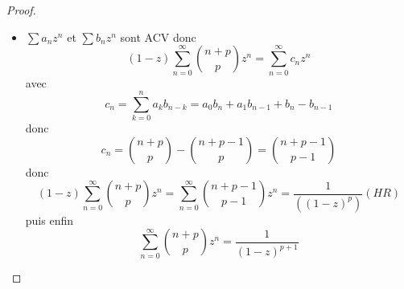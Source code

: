 \documentclass[11pt,hidelinks]{book}
\theoremstyle{mytheoremstyle}
\theoremstyle{mytheoremstyle}
\theoremstyle{mytheoremstyle}
\theoremstyle{mytheoremstyle}
\theoremstyle{mytheoremstyle}
\theoremstyle{mytheoremstyle}
\theoremstyle{mytheoremstyle}
\theoremstyle{mytheoremstyle}
\theoremstyle{myproblemstyle}
\def\is#1{\sum_{n=0}^\infty #1}
\def\se{\sum a_n z^n}
\def\seb#1{\sum #1_n z^n}
\begin{document}
\begin{adjustwidth}{-2em}{-1em}
\begin{prop}
\begin{proof}
\begin{itemize}[label=$\cdot$]
            \item $\se$ et $\seb{b}$ sont ACV donc 
            \begin{equation*}
                (1-z)\is{\binom{n+p}{p}z^n} = \is{c_nz^n}
            \end{equation*}
            avec 
            \begin{equation*}
                c_n = \sum_{k=0}^n a_k b_{n-k} = a_0 b_n + a_1 b_{n-1} + b_n - b_{n-1}
            \end{equation*}
            donc 
            \begin{equation*}
                c_n = \binom{n+p}{p} - \binom{n+p-1}{p} = \binom{n+p-1}{p-1}
            \end{equation*}
            donc 
            \begin{equation*}
                (1-z)\is{\binom{n+p}{p}z^n} = \is{\binom{n+p-1}{p-1}z^n} = \frac{1}{((1-z)^p)} (HR)
            \end{equation*}
            puis enfin 
            \begin{equation*}
                \is{\binom{n+p}{p}z^n} = \frac{1}{(1-z)^{p+1}}
            \end{equation*}


\end{itemize}
\end{proof}
\end{prop}
\end{adjustwidth}
\end{document}
